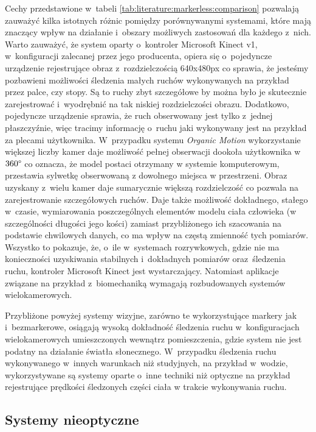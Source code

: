 Cechy przedstawione w~tabeli \ref{tab:literature:markerless:comparison} pozwalają zauważyć kilka istotnych różnic pomiędzy porównywanymi systemami, które mają znaczący wpływ na działanie i~obszary możliwych zastosowań dla każdego z~nich. Warto zauważyć, że system oparty o~kontroler Microsoft Kinect v1, w~konfiguracji zalecanej przez jego producenta, opiera się o~pojedyncze urządzenie rejestrujące obraz z~rozdzielczością 640x480px co sprawia, że jesteśmy pozbawieni możliwości śledzenia małych ruchów wykonywanych na przykład przez palce, czy stopy. Są to ruchy zbyt szczegółowe by można było je skutecznie zarejestrować i~wyodrębnić na tak niskiej rozdzielczości obrazu. Dodatkowo, pojedyncze urządzenie sprawia, że ruch obserwowany jest tylko z~jednej płaszczyźnie, więc tracimy informację o~ruchu jaki wykonywany jest na przykład za plecami użytkownika. W~przypadku systemu \emph{Organic Motion} wykorzystanie większej liczby kamer daje możliwość pełnej obserwacji dookoła użytkownika w~$360\degree$ co oznacza, że model postaci otrzymany w systemie komputerowym, przestawia sylwetkę obserwowaną z dowolnego miejsca w przestrzeni. Obraz uzyskany z~wielu kamer daje sumarycznie większą rozdzielczość co pozwala na zarejestrowanie szczegółowych ruchów. Daje także możliwość dokładnego, stałego w~czasie, wymiarowania poszczególnych elementów modelu ciała człowieka (w szczególności długości jego kości) zamiast przybliżonego ich szacowania na podstawie chwilowych danych, co ma wpływ na częstą zmienność tych pomiarów. Wszystko to pokazuje, że, o~ile w~systemach rozrywkowych, gdzie nie ma konieczności uzyskiwania stabilnych i~dokładnych pomiarów oraz~śledzenia ruchu, kontroler Microsoft Kinect jest wystarczający. Natomiast aplikacje związane na przykład z~biomechaniką wymagają rozbudowanych systemów wielokamerowych.
			
Przybliżone powyżej systemy wizyjne, zarówno te wykorzystujące markery jak i~bezmarkerowe, osiągają wysoką dokładność śledzenia ruchu w~konfiguracjach wielokamerowych umieszczonych wewnątrz pomieszczenia, gdzie system nie jest podatny na działanie światła słonecznego. W~przypadku śledzenia ruchu wykonywanego w~innych warunkach niż studyjnych, na przykład w~wodzie, wykorzystywane są systemy oparte o~inne techniki niż optyczne na przykład rejestrujące prędkości śledzonych części ciała w trakcie wykonywania ruchu.
			
\subsection{Systemy nieoptyczne}
			
